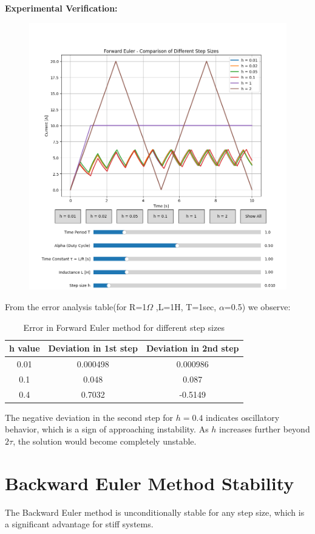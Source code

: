 \documentclass[12pt,a4paper]{report}
\begin{document}
\textbf{Experimental Verification:}
\begin{figure}[h!]
\centering
\includegraphics[scale=0.5]{figs/forward_euler_stability.png}
\end{figure}
From the error analysis table(for R=1$\Omega$ ,L=1H, T=1sec, $\alpha$=0.5)  we observe:
\begin{table}[H]
\centering
\begin{tabular}{|c|c|c|}
\hline
h value & Deviation in 1st step & Deviation in 2nd step \\
\hline
0.01 & 0.000498 & 0.000986 \\
\hline
0.1 & 0.048 & 0.087 \\
\hline
0.4 & 0.7032 & -0.5149 \\
\hline
\end{tabular}
\caption{Error in Forward Euler method for different step sizes}
\end{table}

The negative deviation in the second step for $h = 0.4$ indicates oscillatory behavior, which is a sign of approaching instability. As $h$ increases further beyond $2\tau$, the solution would become completely unstable.

\section{Backward Euler Method Stability}
The Backward Euler method is unconditionally stable for any step size, which is a significant advantage for stiff systems.
\end{document}

